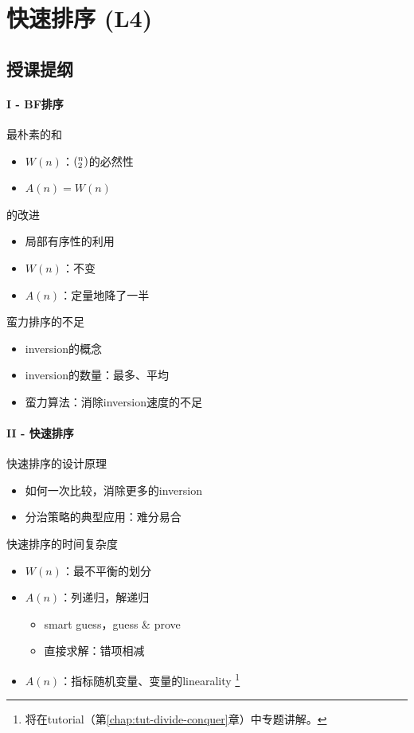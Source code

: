 \chapter{快速排序 (L4)}


\section*{授课提纲}

\subsubsection{I - BF排序}

\nid 最朴素的和
\begin{itemize}
    \item $W(n)$：$\left(^n_2\right)$的必然性
    \item $A(n) = W(n)$
\end{itemize}
    
\nid {}的改进
\begin{itemize}
    \item 局部有序性的利用
    \item $W(n)$：不变
    \item $A(n)$：定量地降了一半
\end{itemize}
    
\nid 蛮力排序的不足
\begin{itemize}
    \item inversion的概念
    \item inversion的数量：最多、平均
    \item 蛮力算法：消除inversion速度的不足
\end{itemize}

\subsubsection{II - 快速排序}

\nid 快速排序的设计原理
\begin{itemize}
    \item 如何一次比较，消除更多的inversion
    \item 分治策略的典型应用：难分易合
\end{itemize}

\nid 快速排序的时间复杂度
\begin{itemize}
    \item $W(n)$：最不平衡的划分

    \item $A(n)$：列递归，解递归
    \begin{itemize}
        \item smart guess，guess \& prove
        \item 直接求解：错项相减
    \end{itemize}

    \item $A(n)$：指标随机变量、变量的linearality \footnote{将在tutorial（第\ref{chap:tut-divide-conquer}章）中专题讲解。}
\end{itemize}

